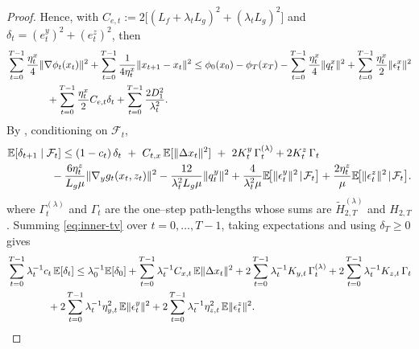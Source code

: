 \documentclass{uai2026} %
\newcommand{\EE}{\mathbb{E}}
\newcommand{\F}{\mathcal{F}}
\begin{document}
\begin{proof}
Hence, with $C_{e,t}:=2\big[(L_f+\lambda_tL_g)^2+(\lambda_tL_g)^2\big]$ and $\delta_t=(e_t^y)^2+(e_t^z)^2$, then
\begin{align}
    \MoveEqLeft[4]\sum_{t=0}^{T-1}\frac{\eta_{t}^{x}}{4}\|\nabla \phi_{t}(x_{t})\|^{2}+\sum_{t=0}^{T-1}\frac{1}{4\eta_{t}^{x}}\|x_{t+1}-x_{t}\|^{2}\le \phi_{0}(x_{0})-\phi_{T}(x_{T})-\sum_{t=0}^{T-1}\frac{\eta_{t}^{x}}{4}\|q_{t}^{x}\|^{2}+\sum_{t=0}^{T-1}\frac{\eta_{t}^{x}}{2}\|\epsilon_{t}^{x}\|^{2}\nonumber\\
        &+\sum_{t=0}^{T-1}\frac{\eta_{t}^{x}}{2}C_{e,t}\delta_{t}+\sum_{t=0}^{T-1}\frac{2D_{1}^{2}}{\lambda_{t}^{2}}.
\end{align}
By , conditioning on $\F_t$,
\begin{align}\label{eq:inner-tv}
\MoveEqLeft[4]\EE[\delta_{t+1}\mid\F_t]
\le(1-c_t)\,\delta_t
~+~C_{t,x}\,\EE[\|\Delta x_t\|^2]
~+~2K_t^y\,\Gamma_t^{(\lambda)}+2K_t^z\,\Gamma_t\nonumber\\
&-\frac{6\eta_{t}^{z}}{L_{g}\mu}\|\nabla_{y}g_{t}(x_{t},z_{t})\|^{2}-\frac{12}{\lambda_{t}^{2}L_{g}\mu}\|q_{t}^{y}\|^{2}+\frac{4}{\lambda_t^{2}\mu}\EE\!\big[\|\epsilon_t^y\|^2\!\mid\!\F_t\big]
+\frac{2\eta_t^z}{\mu}\EE\!\big[\|\epsilon_t^z\|^2\!\mid\!\F_t\big].
\end{align}
where $\Gamma_t^{(\lambda)}$ and $\Gamma_t$ are the one–step path-lengths whose sums are $\widetilde H^{(\lambda)}_{2,T}$ and $H_{2,T}$.
Summing \eqref{eq:inner-tv} over $t=0,\dots,T-1$, taking expectations and using $\delta_T\ge0$ gives
\begin{align}\label{eq:sum-inner}
\MoveEqLeft[4]\sum_{t=0}^{T-1} \lambda_{t}^{-1}c_t\,\EE[\delta_t]
\le  \lambda_{0}^{-1}\EE[\delta_0]
+ \sum_{t=0}^{T-1}  \lambda_{t}^{-1}C_{x,t}\,\EE\|\Delta x_t\|^2
+ 2\sum_{t=0}^{T-1}  \lambda_{t}^{-1}K_{y,t}\,\Gamma_t^{(\lambda)}
+ 2\sum_{t=0}^{T-1}  \lambda_{t}^{-1}K_{z,t}\,\Gamma_t\nonumber\\
&+ 2\sum_{t=0}^{T-1}  \lambda_{t}^{-1}\eta_{y,t}^2\,\EE\|\epsilon_t^y\|^2
+ 2\sum_{t=0}^{T-1} \lambda_{t}^{-1} \eta_{z,t}^2\,\EE\|\epsilon_t^z\|^2.
\end{align}


\end{proof}
\end{document}
